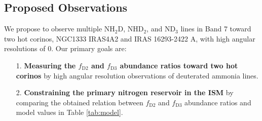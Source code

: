 \documentclass[12pt,a4paper]{article}  %
\newcommand{\ammonia}{NH$_3$\xspace}
\begin{document}




\vspace{-1em}
\subsection{Proposed Observations}
We propose to observe multiple NH$_2$D, NHD$_2$, and ND$_3$ lines in Band 7 toward two hot corinos, NGC1333 IRAS4A2 and IRAS 16293-2422 A, with high angular resolutions of 0. Our primary goals are:

\vspace{-0.3em}
\begin{enumerate}[leftmargin=*]
    \setlength\itemsep{-0.2em}
    
    \item[1.] \textbf{Measuring the $f_\mathrm{D2}$ and $f_\mathrm{D3}$ abundance ratios toward two hot corinos} by high angular resolution observations of deuterated ammonia lines.
    
    \item[2.] \textbf{Constraining the primary nitrogen reservoir in the ISM} by comparing the obtained relation between $f_\mathrm{D2}$ and $f_\mathrm{D3}$ abundance ratios and model values in Table \ref{tab:model}.
    
\end{enumerate}
\vspace{-0.3em}
\end{document}
